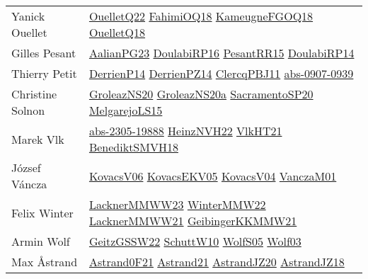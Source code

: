{\begin{longtable}{p{4cm}p{20cm}}
Yanick Ouellet & \href{papers/OuelletQ22.pdf}{OuelletQ22}\cite{OuelletQ22} \href{articles/FahimiOQ18.pdf}{FahimiOQ18}\cite{FahimiOQ18} \href{papers/KameugneFGOQ18.pdf}{KameugneFGOQ18}\cite{KameugneFGOQ18} \href{papers/OuelletQ18.pdf}{OuelletQ18}\cite{OuelletQ18} \\
Gilles Pesant & \href{papers/AalianPG23.pdf}{AalianPG23}\cite{AalianPG23} \href{articles/DoulabiRP16.pdf}{DoulabiRP16}\cite{DoulabiRP16} \href{papers/PesantRR15.pdf}{PesantRR15}\cite{PesantRR15} \href{papers/DoulabiRP14.pdf}{DoulabiRP14}\cite{DoulabiRP14} \\
Thierry Petit & \href{papers/DerrienP14.pdf}{DerrienP14}\cite{DerrienP14} \href{papers/DerrienPZ14.pdf}{DerrienPZ14}\cite{DerrienPZ14} \href{papers/ClercqPBJ11.pdf}{ClercqPBJ11}\cite{ClercqPBJ11} \href{articles/abs-0907-0939.pdf}{abs-0907-0939}\cite{abs-0907-0939} \\
Christine Solnon & \href{papers/GroleazNS20.pdf}{GroleazNS20}\cite{GroleazNS20} \href{papers/GroleazNS20a.pdf}{GroleazNS20a}\cite{GroleazNS20a} \href{articles/SacramentoSP20.pdf}{SacramentoSP20}\cite{SacramentoSP20} \href{papers/MelgarejoLS15.pdf}{MelgarejoLS15}\cite{MelgarejoLS15} \\
Marek Vlk & \href{articles/abs-2305-19888.pdf}{abs-2305-19888}\cite{abs-2305-19888} \href{articles/HeinzNVH22.pdf}{HeinzNVH22}\cite{HeinzNVH22} \href{articles/VlkHT21.pdf}{VlkHT21}\cite{VlkHT21} \href{papers/BenediktSMVH18.pdf}{BenediktSMVH18}\cite{BenediktSMVH18} \\
J{\'{o}}zsef V{\'{a}}ncza & \href{papers/KovacsV06.pdf}{KovacsV06}\cite{KovacsV06} \href{papers/KovacsEKV05.pdf}{KovacsEKV05}\cite{KovacsEKV05} \href{papers/KovacsV04.pdf}{KovacsV04}\cite{KovacsV04} \href{papers/VanczaM01.pdf}{VanczaM01}\cite{VanczaM01} \\
Felix Winter & \href{articles/LacknerMMWW23.pdf}{LacknerMMWW23}\cite{LacknerMMWW23} \href{papers/WinterMMW22.pdf}{WinterMMW22}\cite{WinterMMW22} \href{papers/LacknerMMWW21.pdf}{LacknerMMWW21}\cite{LacknerMMWW21} \href{papers/GeibingerKKMMW21.pdf}{GeibingerKKMMW21}\cite{GeibingerKKMMW21} \\
Armin Wolf & \href{papers/GeitzGSSW22.pdf}{GeitzGSSW22}\cite{GeitzGSSW22} \href{papers/SchuttW10.pdf}{SchuttW10}\cite{SchuttW10} \href{papers/WolfS05.pdf}{WolfS05}\cite{WolfS05} \href{papers/Wolf03.pdf}{Wolf03}\cite{Wolf03} \\
Max {\AA}strand & \href{papers/Astrand0F21.pdf}{Astrand0F21}\cite{Astrand0F21} \href{}{Astrand21}\cite{Astrand21} \href{articles/AstrandJZ20.pdf}{AstrandJZ20}\cite{AstrandJZ20} \href{papers/AstrandJZ18.pdf}{AstrandJZ18}\cite{AstrandJZ18} \\

\end{longtable}}
